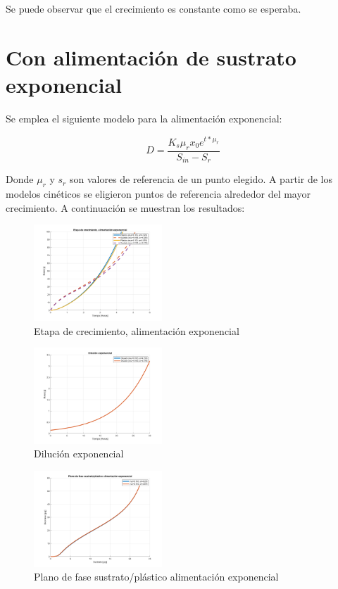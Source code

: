 \documentclass[letterpaper, 10 pt, conference]{ieeeconf}  %
\begin{document}
Se puede observar que el crecimiento es constante como se esperaba.

\section{Con alimentación de sustrato exponencial}

Se emplea el siguiente modelo para la alimentación exponencial:

\begin{equation*}
D = \frac{K_{s}\mu_{r}x_{0}e^{t*\mu_{r}}}{S_{in}-S_{r}}
\end{equation*}

Donde $\mu_{r}$ y $s_{r}$ son valores de referencia de un punto elegido. A partir de los modelos cinéticos se eligieron puntos de referencia alrededor del mayor crecimiento. A continuación se muestran los resultados:


\begin{figure}[H]
  \centering
  \includegraphics[width=0.43\textwidth]{./Images_tp1/D2_growth.png}
  \caption{Etapa de crecimiento, alimentación exponencial}
\end{figure}
\begin{figure}[H]
  \centering
  \includegraphics[width=0.43\textwidth]{./Images_tp1/D2_Ds.png}
  \caption{Dilución exponencial}
\end{figure}
\begin{figure}[H]
  \centering
  \includegraphics[width=0.43\textwidth]{./Images_tp1/D2_plano_fase.png}
  \caption{Plano de fase sustrato/plástico alimentación exponencial}
\end{figure}
\end{document}
